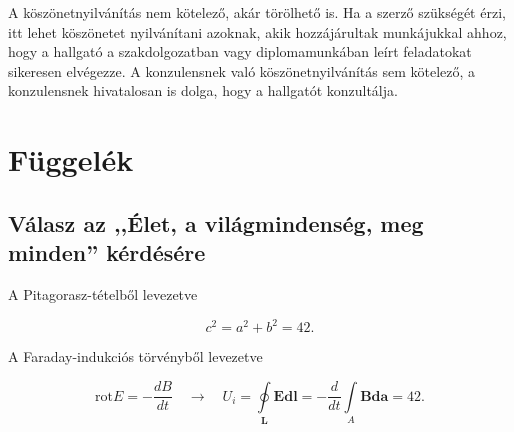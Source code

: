 \documentclass[11pt,magyar,a4paper,oneside,]{report}
\begin{document}
A köszönetnyilvánítás nem kötelező, akár törölhető is. Ha a szerző
szükségét érzi, itt lehet köszönetet nyilvánítani azoknak, akik
hozzájárultak munkájukkal ahhoz, hogy a hallgató a szakdolgozatban vagy
diplomamunkában leírt feladatokat sikeresen elvégezze. A konzulensnek
való köszönetnyilvánítás sem kötelező, a konzulensnek hivatalosan is
dolga, hogy a hallgatót konzultálja.

\listoftables
\listoffigures




\appendix

\chapter{Függelék}\label{fuxfcggeluxe9k}

\section{Válasz az ,,Élet, a világmindenség, meg minden''
kérdésére}\label{vuxe1lasz-az-uxe9let-a-viluxe1gmindensuxe9g-meg-minden-kuxe9rduxe9suxe9re}

A Pitagorasz-tételből levezetve

\[c^2=a^2+b^2=42.\]

A Faraday-indukciós törvényből levezetve

\[\mathrm{rot} E=-\frac{dB}{dt} \quad \longrightarrow \quad U_i=\oint\limits_\mathbf{L}{\mathbf{E}\mathbf{dl}}=-\frac{d}{dt}\int\limits_A{\mathbf{B}\mathbf{da}}=42.\]
\end{document}
